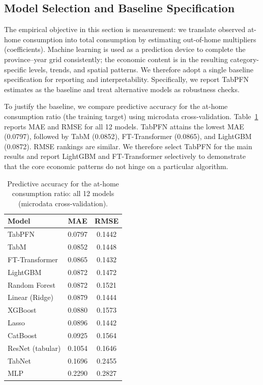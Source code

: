 \documentclass[12pt,a4paper]{article}
\begin{document}
\subsection{Model Selection and Baseline Specification}

The empirical objective in this section is measurement: we translate observed at-home consumption into total consumption by estimating out-of-home multipliers (coefficients). Machine learning is used as a prediction device to complete the province--year grid consistently; the economic content is in the resulting category-specific levels, trends, and spatial patterns. We therefore adopt a single baseline specification for reporting and interpretability. Specifically, we report TabPFN estimates as the baseline and treat alternative models as robustness checks.

To justify the baseline, we compare predictive accuracy for the at-home consumption ratio (the training target) using microdata cross-validation. Table~\ref{tab:model_accuracy_full} reports MAE and RMSE for all 12 models. TabPFN attains the lowest MAE (0.0797), followed by TabM (0.0852), FT-Transformer (0.0865), and LightGBM (0.0872). RMSE rankings are similar. We therefore select TabPFN for the main results and report LightGBM and FT-Transformer selectively to demonstrate that the core economic patterns do not hinge on a particular algorithm.

\begin{table}[htbp]
\centering
\caption{Predictive accuracy for the at-home consumption ratio: all 12 models (microdata cross-validation).}
\label{tab:model_accuracy_full}
\begin{tabular}{lcc}
\toprule
Model & MAE & RMSE \\
\midrule
TabPFN & 0.0797 & 0.1442 \\
TabM & 0.0852 & 0.1448 \\
FT-Transformer & 0.0865 & 0.1432 \\
LightGBM & 0.0872 & 0.1472 \\
Random Forest & 0.0872 & 0.1521 \\
Linear (Ridge) & 0.0879 & 0.1444 \\
XGBoost & 0.0880 & 0.1573 \\
Lasso & 0.0896 & 0.1442 \\
CatBoost & 0.0925 & 0.1564 \\
ResNet (tabular) & 0.1054 & 0.1646 \\
TabNet & 0.1696 & 0.2455 \\
MLP & 0.2290 & 0.2827 \\
\bottomrule
\end{tabular}
\end{table}
\end{document}
